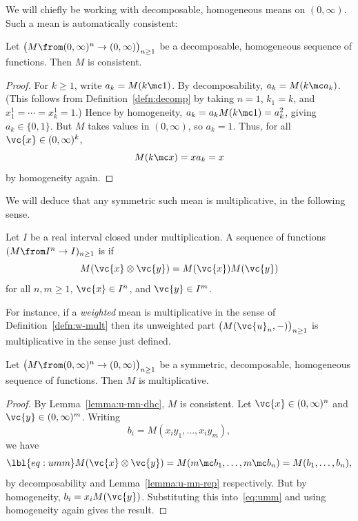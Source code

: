 We will chiefly be working with decomposable, homogeneous means on $(0,
\infty)$.  Such a mean is automatically consistent:

\begin{lemma}
Let $\bigl( M \from (0, \infty)^n \to (0, \infty) \bigr)_{n \geq 1}$ be a
decomposable, homogeneous sequence of functions.  Then $M$ is consistent.
\end{lemma}

\begin{proof}
For $k \geq 1$, write $a_k = M(k \mc 1)$.  By decomposability, $a_k = M(k
\mc a_k)$.  (This follows from Definition~\ref{defn:decomp} by taking $n =
1$, $k_1 = k$, and $x^1_1 = \cdots = x^1_k = 1$.)  Hence by homogeneity,
$a_k = a_k M(k \mc 1) = a_k^2$, giving $a_k \in \{0, 1\}$.  But $M$ takes
values in $(0, \infty)$, so $a_k = 1$.  Thus, for all $\vc{x} \in (0,
\infty)^k$,
\[
M(k \mc x) = x a_k = x
\]
by homogeneity again.
\end{proof}

We will deduce that any symmetric such mean is multiplicative, in the
following sense.

\begin{defn}
Let $I$ be a real interval closed under multiplication.  A sequence of
functions $(M \from I^n \to I)_{n \geq 1}$ is %
% 
% 
if 
\[
M(\vc{x} \otimes \vc{y}) = M(\vc{x}) M(\vc{y})
\]
for all $n, m \geq 1$, $\vc{x} \in I^n$, and $\vc{y} \in I^m$.
\end{defn}

For instance, if a \emph{weighted} mean is multiplicative in the sense of
Definition~\ref{defn:w-mult} then its unweighted part $\bigl(M(\vc{u}_n,
-)\bigr)_{n \geq 1}$ is multiplicative in the sense just defined.

\begin{lemma}
Let $\bigl( M \from (0, \infty)^n \to (0, \infty) \bigr)_{n \geq 1}$ be a
symmetric, decomposable, homogeneous sequence of functions.  Then $M$ is
multiplicative. 
\end{lemma}

\begin{proof}
By Lemma~\ref{lemma:u-mn-dhc}, $M$ is consistent.  Let $\vc{x} \in (0,
\infty)^n$ and $\vc{y} \in (0, \infty)^m$.  Writing
\[
b_i = M(x_i y_1, \ldots, x_i y_m),
\]
we have
% 
\begin{equation}
\lbl{eq:umm}
M(\vc{x} \otimes \vc{y})
=
M(m \mc b_1, \ldots, m \mc b_n)
=
M(b_1, \ldots, b_n),
\end{equation}
% 
by decomposability and Lemma~\ref{lemma:u-mn-rep} respectively.  But by
homogeneity, $b_i = x_i M(\vc{y})$.  Substituting this into~\eqref{eq:umm}
and using homogeneity again gives the result.
\end{proof}

